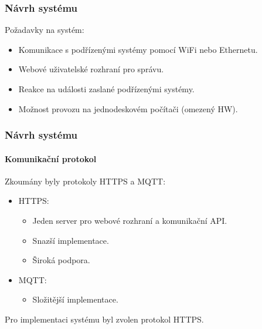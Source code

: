\documentclass{beamer}
\begin{document}
  \begin{frame}
    \frametitle{Návrh systému}



      Požadavky na systém:

      \begin{itemize}
        \item Komunikace s podřízenými systémy pomocí WiFi nebo Ethernetu.
        \item Webové uživatelské rozhraní pro správu.
        \item Reakce na události zaslané podřízenými systémy.
        \item Možnost provozu na jednodeskovém počítači (omezený HW). %
      \end{itemize}
  \end{frame}

  \begin{frame}
    \frametitle{Návrh systému}
    \framesubtitle{Komunikační protokol}

    Zkoumány byly protokoly HTTPS a MQTT:

    \begin{itemize}
      \item HTTPS: 
      \begin{itemize}
        \item Jeden server pro webové rozhraní a komunikační API.
        \item Snazší implementace.
        \item Široká podpora.
      \end{itemize}
      \item MQTT:
      \begin{itemize}
        \item Složitější implementace.
      \end{itemize}
    \end{itemize}

    Pro implementaci systému byl zvolen protokol HTTPS.


  \end{frame}
\end{document}
